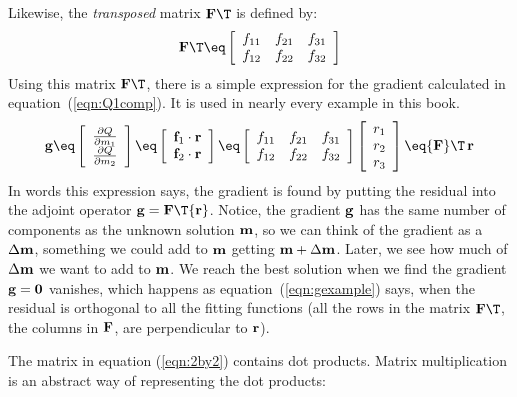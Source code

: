Likewise, the {\it transposed} matrix $\bold F\T$ is defined by:
\begin{equation}
\bold F\T \eq
\left[ 
\begin{array}{ccc}
  f_{11} & f_{21} & f_{31}  \\
  f_{12} & f_{22} & f_{32}  \end{array} \right] 
\end{equation}
Using this matrix ${\bold F\T}$, there is a simple expression
for the gradient calculated in equation~(\ref{eqn:Q1comp}).
It is used in nearly every example in this book.
%
\begin{equation}
\bold g \eq 
\left[
\begin{array}{c}
\frac{\partial Q}{\partial m_1} \\
\frac{\partial Q}{\partial m_2}
\end{array}
\right]
\eq
\left[
\begin{array}{c}
{\bf f}_1 \cdot {\bf r} \\
{\bf f}_2 \cdot {\bf r}
\end{array}
\right]
\eq
\left[ 
\begin{array}{ccc}
  f_{11} & f_{21}  & f_{31} \\
  f_{12} & f_{22}  & f_{32}
 \end{array} \right] 
\left[
\begin{array}{c}
r_1 \\
r_2 \\
r_3
\end{array}
\right]
\eq
{\bf F}\T\,{\bf r}
\label{eqn:gexample}
\end{equation}
%
In words this expression says, the gradient is found by putting the
residual into the adjoint operator ${\bf g} = {\bf F}\T {\bf
  r}$. Notice, the gradient ${\bf g}$ has the same number of
components as the unknown solution ${\bf m}$, so we can think of the
gradient as a $\Delta {\bf m}$, something we could add to ${\bf m}$
getting ${\bf m}  + \Delta {\bf m}$.  Later, we see how much of
$\Delta {\bf m}$ we want to add to ${\bf m}$.  We reach the best
solution when we find the gradient ${\bf g} = {\bf 0}$ vanishes, which
happens as equation~(\ref{eqn:gexample}) says, when the residual is orthogonal to all the fitting functions (all the rows in the matrix ${\bf F}\T$, the columns in ${\bf F}$, are perpendicular  to ${\bf r}$). 
\par
The matrix in equation (\ref{eqn:2by2})
contains dot products.
Matrix multiplication is an abstract way of representing the dot products:
